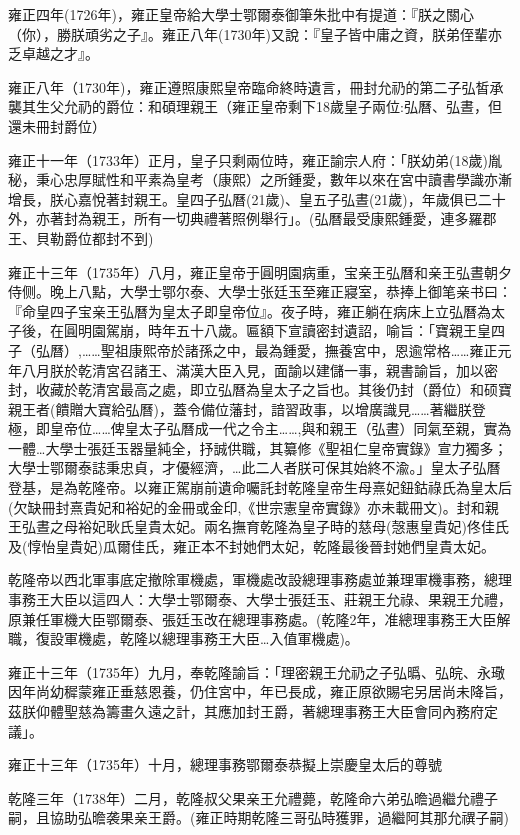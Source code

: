 雍正四年(1726年)，雍正皇帝給大學士鄂爾泰御筆朱批中有提道：『朕之關心（你），勝朕頑劣之子』。雍正八年(1730年)又說：『皇子皆中庸之資，朕弟侄輩亦乏卓越之才』。

雍正八年（1730年)，雍正遵照康熙皇帝臨命終時遺言，冊封允礽的第二子弘皙承襲其生父允礽的爵位：和碩理親王（雍正皇帝剩下18歲皇子兩位:弘曆、弘晝，但還未冊封爵位）

雍正十一年（1733年）正月，皇子只剩兩位時，雍正諭宗人府：「朕幼弟(18歲)胤秘，秉心忠厚賦性和平素為皇考（康熙）之所鍾愛，數年以來在宮中讀書學識亦漸增長，朕心嘉悅著封親王。皇四子弘曆(21歲)、皇五子弘晝(21歲)，年歲俱已二十外，亦著封為親王，所有一切典禮著照例舉行」。(弘曆最受康熙鍾愛，連多羅郡王、貝勒爵位都封不到)

雍正十三年（1735年）八月，雍正皇帝于圓明園病重，宝亲王弘曆和亲王弘晝朝夕侍侧。晚上八點，大學士鄂尔泰、大學士张廷玉至雍正寢室，恭捧上御笔亲书曰：『命皇四子宝亲王弘曆为皇太子即皇帝位』。夜子時，雍正躺在病床上立弘曆為太子後，在圓明園駕崩，時年五十八歲。匾額下宣讀密封遺詔，喻旨：「寶親王皇四子（弘曆）,……聖祖康熙帝於諸孫之中，最為鍾愛，撫養宮中，恩逾常格……雍正元年八月朕於乾清宮召諸王、滿漢大臣入見，面諭以建儲一事，親書諭旨，加以密封，收藏於乾清宮最高之處，即立弘曆為皇太子之旨也。其後仍封（爵位）和硕寶親王者(饋贈大寶給弘曆)，蓋令備位藩封，諳習政事，以增廣識見……著繼朕登極，即皇帝位……俾皇太子弘曆成一代之令主……,與和親王（弘晝）同氣至親，實為一體…大學士張廷玉器量純全，抒誠供職，其纂修《聖祖仁皇帝實錄》宣力獨多；大學士鄂爾泰誌秉忠貞，才優經濟，…此二人者朕可保其始終不渝。」皇太子弘曆登基，是為乾隆帝。以雍正駕崩前遺命囑託封乾隆皇帝生母熹妃鈕鈷祿氏為皇太后(欠缺冊封熹貴妃和裕妃的金冊或金印,《世宗憲皇帝實錄》亦未載冊文)。封和親王弘晝之母裕妃耿氏皇貴太妃。兩名撫育乾隆為皇子時的慈母(愨惠皇貴妃)佟佳氏及(惇怡皇貴妃)瓜爾佳氏，雍正本不封她們太妃，乾隆最後晉封她們皇貴太妃。

乾隆帝以西北軍事底定撤除軍機處，軍機處改設總理事務處並兼理軍機事務，總理事務王大臣以這四人：大學士鄂爾泰、大學士張廷玉、莊親王允祿、果親王允禮，原兼任軍機大臣鄂爾泰、張廷玉改在總理事務處。(乾隆2年，准總理事務王大臣解職，復設軍機處，乾隆以總理事務王大臣…入值軍機處)。

雍正十三年（1735年）九月，奉乾隆諭旨：「理密親王允礽之子弘㬙、弘皖、永璥因年尚幼穉蒙雍正垂慈恩養，仍住宮中，年已長成，雍正原欲賜宅另居尚未降旨，茲朕仰體聖慈為籌畫久遠之計，其應加封王爵，著總理事務王大臣會同內務府定議」。

雍正十三年（1735年）十月，總理事務鄂爾泰恭擬上崇慶皇太后的尊號

乾隆三年（1738年）二月，乾隆叔父果亲王允禮薨，乾隆命六弟弘曕過繼允禮子嗣，且協助弘曕袭果亲王爵。(雍正時期乾隆三哥弘時獲罪，過繼阿其那允禩子嗣)

